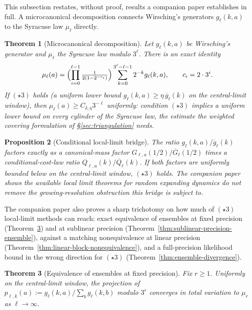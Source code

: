 \documentclass[11pt]{article}
\newtheorem{theorem}{Theorem}[section]
\newtheorem{proposition}[theorem]{Proposition}
\theoremstyle{definition}
\theoremstyle{remark}
\begin{document}
This subsection restates, without proof, results a companion paper
\cite{WirschingCompanion} establishes in full. A microcanonical
decomposition connects Wirsching's generators $g_\ell(k,a)$ to the
Syracuse law $\mu_\ell$ directly.

\begin{theorem}[Microcanonical decomposition]\label{thm:microcanonical}
Let $g_\ell(k,a)$ be Wirsching's generator and $\mu_\ell$ the Syracuse
law modulo $3^\ell$. There is an exact identity
\begin{equation}\label{eq:microcanonical}
\mu_\ell(a)=\Bigl(\prod_{i=0}^{\ell-1}\tfrac{1}{2(1-2^{-c_i})}\Bigr)
\sum_{k=0}^{3^\ell-\ell-1}2^{-k}g_\ell(k,a), \qquad c_i=2\cdot3^i.
\end{equation}
If $(\star3)$ holds (a uniform
lower bound $g_\ell(k,a)\ge\eta\,\overline g_\ell(k)$ on the
central-limit window), then $\mu_\ell(a)\ge C_{\delta,\eta}3^{-\ell}$
uniformly: condition $(\star3)$ implies a uniform lower bound on every
cylinder of the Syracuse law, the estimate the weighted covering
formulation of \S\ref{sec:triangulation} needs.
\end{theorem}

\begin{proposition}[Conditional local-limit bridge]
\label{prop:complex-deconditioning}
The ratio $g_\ell(k,a)/\overline g_\ell(k)$ factors exactly as a
canonical-mass factor $G_{\ell,a}(1/2)/\overline G_\ell(1/2)$ times a
conditional-cost-law ratio $Q_{\ell,a}(k)/\overline Q_\ell(k)$. If both
factors are uniformly bounded below on the central-limit window, $(\star3)$
holds. The companion paper shows the available local limit theorems for
random expanding dynamics \cite{DragicevicEtAl2018,Hafouta2020} do not
remove the growing-resolution obstruction this bridge is subject to.
\end{proposition}

The companion paper also proves a sharp trichotomy on how much of
$(\star3)$ local-limit methods can reach: exact equivalence of ensembles at
fixed precision (Theorem~\ref{thm:fixed-precision-ensemble}) and at
sublinear precision (Theorem~\ref{thm:sublinear-precision-ensemble}),
against a matching nonequivalence at linear precision
(Theorem~\ref{thm:linear-block-nonequivalence}), and a full-precision
likelihood bound in the wrong direction for $(\star3)$
(Theorem~\ref{thm:ensemble-divergence}).

\begin{theorem}[Equivalence of ensembles at fixed precision]
\label{thm:fixed-precision-ensemble}
Fix $r\ge1$. Uniformly on the central-limit window, the projection of
$p_{\ell,k}(a):=g_\ell(k,a)/\sum_bg_\ell(k,b)$ modulo $3^r$ converges in
total variation to $\mu_r$ as $\ell\to\infty$.
\end{theorem}
\end{document}
